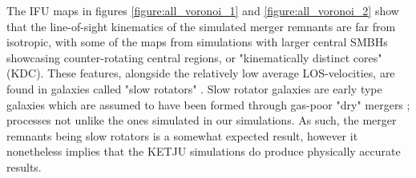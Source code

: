 \documentclass[english, oneside]{HYgradu}
\begin{document}
The IFU maps in figures \ref{figure:all_voronoi_1} and \ref{figure:all_voronoi_2} show that the line-of-sight kinematics of the simulated merger remnants are far from isotropic, with some of the maps from simulations with larger central SMBHs showcasing counter-rotating central regions, or "kinematically distinct cores" (KDC). These features, alongside the relatively low average LOS-velocities, are found in galaxies called "slow rotators" \citep{Emsellem2007}. Slow rotator galaxies are early type galaxies which are assumed to have been formed through gas-poor "dry" mergers \citep{Emsellem2007, Cappellari2007}; processes not unlike the ones simulated in our simulations. As such, the merger remnants being slow rotators is a somewhat expected result, however it nonetheless implies that the KETJU simulations do produce physically accurate results.
\end{document}
